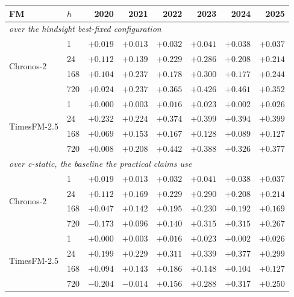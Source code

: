 \begin{tabular}{llrrrrrr}
\toprule
FM & $h$ & 2020 & 2021 & 2022 & 2023 & 2024 & 2025 \\
\midrule
\multicolumn{8}{l}{\emph{over the hindsight best-fixed configuration}} \\
\midrule
\multirow{4}{*}{Chronos-2}
 & 1 & $+0.019$ & $+0.013$ & $+0.032$ & $+0.041$ & $+0.038$ & $+0.037$ \\
 & 24 & $+0.112$ & $+0.139$ & $+0.229$ & $+0.286$ & $+0.208$ & $+0.214$ \\
 & 168 & $+0.104$ & $+0.237$ & $+0.178$ & $+0.300$ & $+0.177$ & $+0.244$ \\
 & 720 & $+0.024$ & $+0.237$ & $+0.365$ & $+0.426$ & $+0.461$ & $+0.352$ \\
\midrule
\multirow{4}{*}{TimesFM-2.5}
 & 1 & $+0.000$ & $+0.003$ & $+0.016$ & $+0.023$ & $+0.002$ & $+0.026$ \\
 & 24 & $+0.232$ & $+0.224$ & $+0.374$ & $+0.399$ & $+0.394$ & $+0.399$ \\
 & 168 & $+0.069$ & $+0.153$ & $+0.167$ & $+0.128$ & $+0.089$ & $+0.127$ \\
 & 720 & $+0.008$ & $+0.208$ & $+0.442$ & $+0.388$ & $+0.326$ & $+0.377$ \\
\midrule
\multicolumn{8}{l}{\emph{over c-static, the baseline the practical claims use}} \\
\midrule
\multirow{4}{*}{Chronos-2}
 & 1 & $+0.019$ & $+0.013$ & $+0.032$ & $+0.041$ & $+0.038$ & $+0.037$ \\
 & 24 & $+0.112$ & $+0.169$ & $+0.229$ & $+0.290$ & $+0.208$ & $+0.214$ \\
 & 168 & $+0.047$ & $+0.142$ & $+0.195$ & $+0.230$ & $+0.192$ & $+0.169$ \\
 & 720 & $-0.173$ & $+0.096$ & $+0.140$ & $+0.315$ & $+0.315$ & $+0.267$ \\
\midrule
\multirow{4}{*}{TimesFM-2.5}
 & 1 & $+0.000$ & $+0.003$ & $+0.016$ & $+0.023$ & $+0.002$ & $+0.026$ \\
 & 24 & $+0.199$ & $+0.229$ & $+0.311$ & $+0.339$ & $+0.377$ & $+0.299$ \\
 & 168 & $+0.094$ & $+0.143$ & $+0.186$ & $+0.148$ & $+0.104$ & $+0.127$ \\
 & 720 & $-0.204$ & $-0.014$ & $+0.156$ & $+0.288$ & $+0.317$ & $+0.250$ \\
\bottomrule
\end{tabular}
